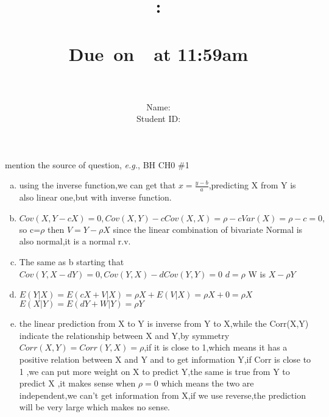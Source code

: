 \documentclass{article}
\title{
    \vspace{2in}
    \textmd{\textbf{\hmwkClass:\\  \hmwkTitle}}\\
    \normalsize\vspace{0.1in}\small{Due\ on\ \hmwkDueDate\ at 11:59am}\\
   \vspace{2in}\Huge{\hmwkClassID}\\   
   \vspace{2in}
}
\author{
	Name: \textbf{\hmwkAuthorName} \\
	Student ID: \hmwkAuthorID}
\date{}
\begin{document}
\maketitle
\pagebreak

\begin{homeworkProblem}{{\color{blue}mention the source of question}, \textit{e.g.}, BH CH0 \#1}
\begin{enumerate}[(a)]
	\item using the inverse function,we can get that $x=\frac{y-b}{a}$,predicting X from Y is also linear one,but with inverse function.
	\item $Cov(X,Y-cX)=0,Cov(X,Y)-cCov(X,X)=\rho-cVar(X)=\rho -c=0,$ so c=$\rho$ then $V=Y-\rho X$  since the linear combination of bivariate Normal is also normal,it is a normal r.v. 
	\item The same as b starting that $Cov(Y,X-dY)=0,Cov(Y,X)-dCov(Y,Y)=0$  $d=\rho$  W is $X-\rho Y$
	\item $E(Y|X)=E(cX+V|X)=\rho X+E(V|X)=\rho X+0=\rho X$ $E(X|Y)=E(dY+W|Y)=\rho Y$ 
	\item  the linear prediction from X to Y is inverse from Y to X,while the Corr(X,Y) indicate the relationship between X and Y,by symmetry $Corr(X,Y)=Corr(Y,X)=\rho$,if it is close to 1,which means it has a positive relation between X and Y and to get information Y,if Corr is close to 1 ,we can put more weight on X to predict Y,the same is true from Y to predict X ,it makes sense when $\rho =0$ which means the two are independent,we can't get information from X,if we use reverse,the prediction will be very large which makes no sense. 
\end{enumerate}
	
\end{homeworkProblem}
\end{document}
